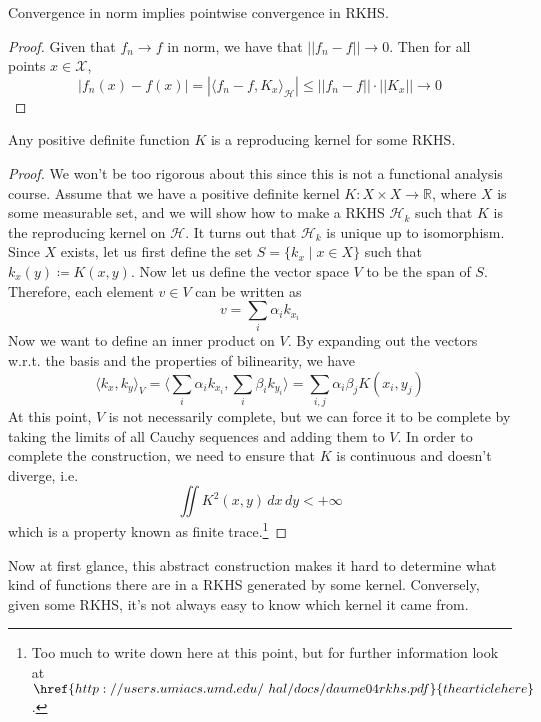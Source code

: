   \begin{corollary}
    Convergence in norm implies pointwise convergence in RKHS. 
  \end{corollary}
  \begin{proof}
    Given that $f_n \rightarrow f$ in norm, we have that $||f_n - f|| \rightarrow 0$. Then for all points $x \in \mathcal{X}$, 
    \begin{equation}
      |f_n(x) - f(x)| = |\langle f_n - f, K_x \rangle_{\mathcal{H}}| \leq ||f_n - f|| \cdot ||K_x|| \rightarrow 0
    \end{equation}
  \end{proof}

  \begin{theorem} 
    Any positive definite function $K$ is a reproducing kernel for some RKHS.  
  \end{theorem} 
  \begin{proof} 
    We won't be too rigorous about this since this is not a functional analysis course. Assume that we have a positive definite kernel $K: X \times X \rightarrow \mathbb{R}$, where $X$ is some measurable set, and we will show how to make a RKHS $\mathcal{H}_k$ such that $K$ is the reproducing kernel on $\mathcal{H}$. It turns out that $\mathcal{H}_k$ is unique up to isomorphism. Since $X$ exists, let us first define the set $S = \{ k_x \mid x \in X\}$ such that $k_x (y) \coloneqq K(x, y)$. Now let us define the vector space $V$ to be the span of $S$. Therefore, each element $v \in V$ can be written as 
    \[v = \sum_i \alpha_i k_{x_i}\]
    Now we want to define an inner product on $V$. By expanding out the vectors w.r.t. the basis and the properties of bilinearity, we have 
    \[\langle k_x, k_y \rangle_{V} = \bigg\langle \sum_i \alpha_i k_{x_i} , \sum_i \beta_i k_{y_i} \bigg\rangle = \sum_{i, j} \alpha_i \beta_j K(x_i, y_j)\] 
    At this point, $V$ is not necessarily complete, but we can force it to be complete by taking the limits of all Cauchy sequences and adding them to $V$. In order to complete the construction, we need to ensure that $K$ is continuous and doesn't diverge, i.e. 
    \[\iint K^2 (x, y) \,dx\,dy < +\infty\]
    which is a property known as finite trace.\footnote{Too much to write down here at this point, but for further information look at $\href{http://users.umiacs.umd.edu/~hal/docs/daume04rkhs.pdf}{the article here}$.}
  \end{proof}

  Now at first glance, this abstract construction makes it hard to determine what kind of functions there are in a RKHS generated by some kernel. Conversely, given some RKHS, it's not always easy to know which kernel it came from. 

